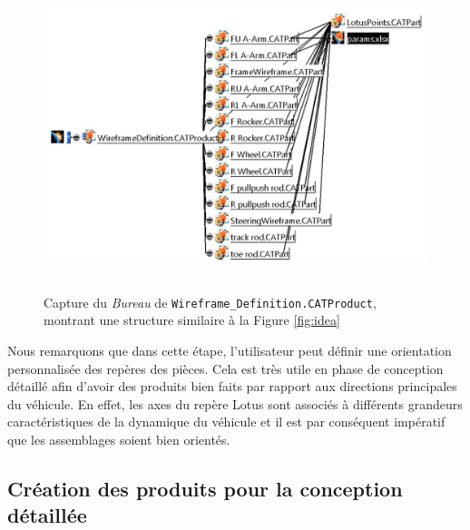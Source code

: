 \begin{figure}[H]
    \centering
    \includegraphics[height=9cm]{img/Desk_wireframe_definition.JPG}
    \caption{Capture du \textit{Bureau} de \texttt{Wireframe\_Definition.CATProduct}, montrant une structure similaire à la Figure \ref{fig:idea}}
    \label{fig:desk_wireframe_definition}
\end{figure}

\par Nous remarquons que dans cette étape, l'utilisateur peut définir une orientation personnalisée des repères des pièces. Cela est très utile en phase de conception détaillé afin d'avoir des produits bien faits par rapport aux directions principales du véhicule. En effet, les axes du repère Lotus sont associés à différents grandeurs caractéristiques de la dynamique du véhicule et il est par conséquent impératif que les assemblages soient bien orientés.

\subsection{Création des produits pour la conception détaillée} %

